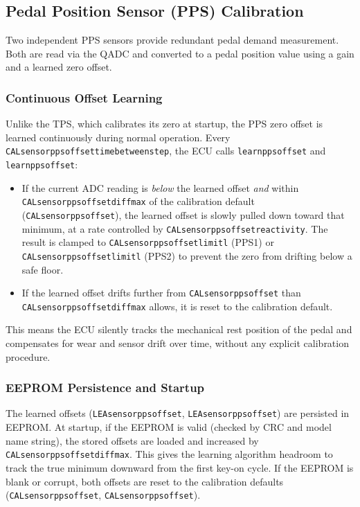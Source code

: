\documentclass[a4paper,11pt]{article}
\renewcommand{\_}{\oldunderscore\allowbreak}
\begin{document}
\subsection{Pedal Position Sensor (PPS) Calibration}

Two independent PPS sensors provide redundant pedal demand measurement. Both are
read via the QADC and converted to a pedal position value using a gain and a
learned zero offset.

\subsubsection*{Continuous Offset Learning}

Unlike the TPS, which calibrates its zero at startup, the PPS zero offset is
learned continuously during normal operation. Every
\texttt{CAL\_sensor\_pps\_offset\_time\_between\_step}, the ECU calls
\texttt{learn\_pps\_1\_offset} and \texttt{learn\_pps\_2\_offset}:

\begin{itemize}
\item If the current ADC reading is \emph{below} the learned offset
      \emph{and} within \texttt{CAL\_sensor\_pps\_offset\_diff\_max} of the
      calibration default (\texttt{CAL\_sensor\_pps\_1\_offset}), the learned
      offset is slowly pulled down toward that minimum, at a rate controlled by
      \texttt{CAL\_sensor\_pps\_offset\_reactivity}. The result is clamped to
      \texttt{CAL\_sensor\_pps\_1\_offset\_limit\_l} (PPS1) or
      \texttt{CAL\_sensor\_pps\_2\_offset\_limit\_l} (PPS2) to prevent the
      zero from drifting below a safe floor.
\item If the learned offset drifts further from \texttt{CAL\_sensor\_pps\_1\_offset}
      than \texttt{CAL\_sensor\_pps\_offset\_diff\_max} allows, it is reset to
      the calibration default.
\end{itemize}

This means the ECU silently tracks the mechanical rest position of the
pedal and compensates for wear and sensor drift over time, without any
explicit calibration procedure.

\subsubsection*{EEPROM Persistence and Startup}

The learned offsets (\texttt{LEA\_sensor\_pps\_1\_offset},
\texttt{LEA\_sensor\_pps\_2\_offset}) are persisted in EEPROM. At startup,
if the EEPROM is valid (checked by CRC and model name string), the stored
offsets are loaded and increased by \texttt{CAL\_sensor\_pps\_offset\_diff\_max}.
This gives the learning algorithm headroom to track the true minimum downward
from the first key-on cycle. If the EEPROM is blank or corrupt, both offsets are reset to the
calibration defaults (\texttt{CAL\_sensor\_pps\_1\_offset},
\texttt{CAL\_sensor\_pps\_2\_offset}).
\end{document}

